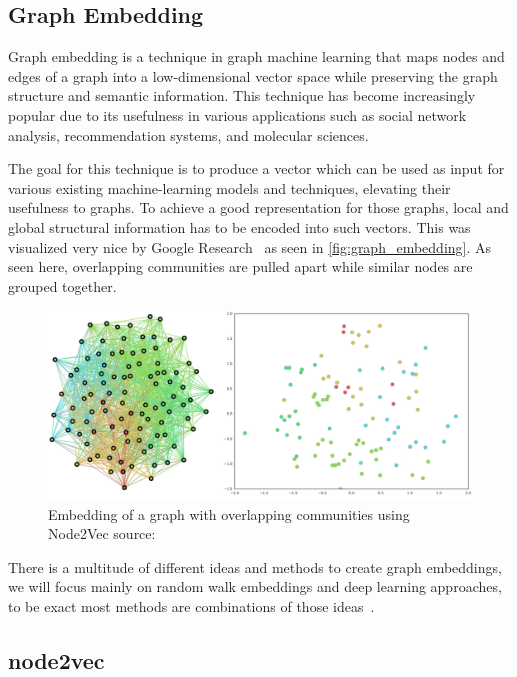 \subsection{Graph Embedding}
Graph embedding is a technique in graph machine learning that maps nodes and edges of a graph into a low-dimensional vector space while preserving the graph structure and semantic information. This technique has become increasingly popular due to its usefulness in various applications such as social network analysis, recommendation systems, and molecular sciences.

The goal for this technique is to produce a vector which can be used as input for various existing machine-learning models and techniques, elevating their usefulness to graphs. To achieve a good representation for those graphs, local and global structural information has to be encoded into such vectors. This was visualized very nice by Google Research~\cite{epasto2019embedding} as seen in \autoref{fig:graph_embedding}. As seen here, overlapping communities are pulled apart while similar nodes are grouped together.

\begin{figure}[ht!]
    \centering
    \includegraphics[scale=0.35]{tex/res/graph_embedding.png}
    \caption{Embedding of a graph with overlapping communities using Node2Vec \tiny{source: \cite{epasto2019embedding}}}
    \label{fig:graph_embedding}
\end{figure}

There is a multitude of different ideas and methods to create graph embeddings, we will focus mainly on random walk embeddings and deep learning approaches, to be exact most methods are combinations of those ideas~\cite{2017graph2vec,2016node2vec,2021graphormer}.
\subsection{node2vec}

